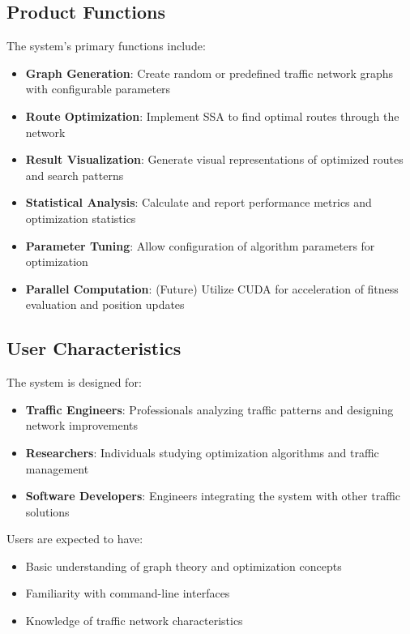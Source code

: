\documentclass[conference]{IEEEtran}
\begin{document}
\subsection{Product Functions}
The system's primary functions include:

\begin{itemize}
    \item \textbf{Graph Generation}: Create random or predefined traffic network graphs with configurable parameters
    \item \textbf{Route Optimization}: Implement SSA to find optimal routes through the network
    \item \textbf{Result Visualization}: Generate visual representations of optimized routes and search patterns
    \item \textbf{Statistical Analysis}: Calculate and report performance metrics and optimization statistics
    \item \textbf{Parameter Tuning}: Allow configuration of algorithm parameters for optimization
    \item \textbf{Parallel Computation}: (Future) Utilize CUDA for acceleration of fitness evaluation and position updates
\end{itemize}

\subsection{User Characteristics}
The system is designed for:

\begin{itemize}
    \item \textbf{Traffic Engineers}: Professionals analyzing traffic patterns and designing network improvements
    \item \textbf{Researchers}: Individuals studying optimization algorithms and traffic management
    \item \textbf{Software Developers}: Engineers integrating the system with other traffic solutions
\end{itemize}

Users are expected to have:
\begin{itemize}
    \item Basic understanding of graph theory and optimization concepts
    \item Familiarity with command-line interfaces
    \item Knowledge of traffic network characteristics
\end{itemize}
\end{document}

